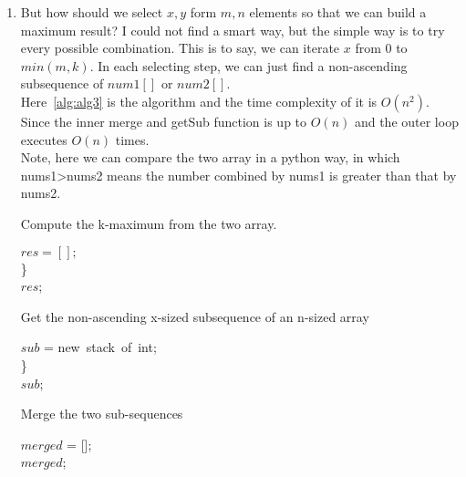 \documentclass[12pt,a4paper]{article}
\makeatletter
\newtheorem*{solution}{Solution}
\renewenvironment{solution}[1][Solution] {\par\pushQED{\qed}\normalfont\topsep6\p@\@plus6\p@\relax\trivlist\item[\hskip\labelsep\bfseries#1\@addpunct{.}]\ignorespaces}{\popQED\endtrivlist\@endpefalse} \makeatother
\makeatother
\begin{document}
\begin{enumerate}
\begin{solution}
But how should we select $x,y$ form $m,n$ elements so that we can build a maximum result? I could not find a smart way, but the simple way is to try every possible combination. This is to say, we can iterate $x$ from 0 to $min(m,k)$. In each selecting step, we can just find a non-ascending subsequence of $num1[]$ or $num2[]$.\\
Here~\ref{alg:alg3} is the algorithm and the time complexity of it is $O(n^2)$.\\
Since the inner merge and getSub function is up to $O(n)$ and the outer loop executes $O(n)$ times.\\
Note, here we can compare the two array in a python way, in which nums1>nums2 means the number combined by nums1 is greater than that by nums2.
\pagebreak

\begin{algorithm} 
  \label{alg:alg3}
  \caption{Compute the k-maximum from the two array.} 
  		$res = [];$\\
  \}\\
  \Return $res$;
\end{algorithm}





\begin{algorithm} 
  \label{alg:alg4}
  \caption{Get the non-ascending x-sized subsequence of an n-sized array} 

	$sub$ = new~stack~of~int;\\
  \}\\
  \Return $sub$;
\end{algorithm}

\begin{algorithm} 
  \label{alg:alg5}
  \caption{Merge the two sub-sequences} 
  		$merged$ = [];\\
  \Return $merged$;
\end{algorithm}







\end{solution}


~\\
~\\


\end{enumerate}
\end{document}
